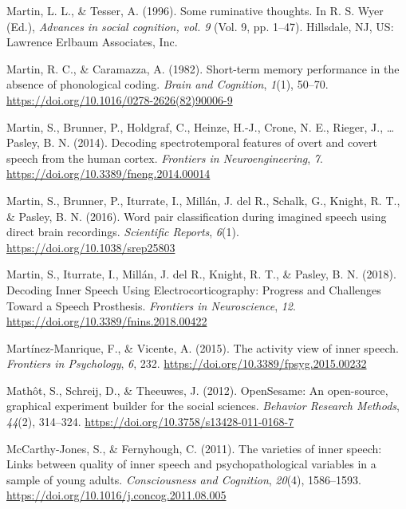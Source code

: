 \documentclass[a4paper,12pt,twoside,openright,oldfontcommands]{memoir}
\begin{document}
\leavevmode\hypertarget{ref-Martin}{}%
Martin, L. L., \& Tesser, A. (1996). Some ruminative thoughts. In R. S. Wyer (Ed.), \emph{Advances in social cognition, vol. 9} (Vol. 9, pp. 1--47). Hillsdale, NJ, US: Lawrence Erlbaum Associates, Inc.

\leavevmode\hypertarget{ref-martin_short-term_1982}{}%
Martin, R. C., \& Caramazza, A. (1982). Short-term memory performance in the absence of phonological coding. \emph{Brain and Cognition}, \emph{1}(1), 50--70. \url{https://doi.org/10.1016/0278-2626(82)90006-9}

\leavevmode\hypertarget{ref-martin_decoding_2014}{}%
Martin, S., Brunner, P., Holdgraf, C., Heinze, H.-J., Crone, N. E., Rieger, J., \ldots{} Pasley, B. N. (2014). Decoding spectrotemporal features of overt and covert speech from the human cortex. \emph{Frontiers in Neuroengineering}, \emph{7}. \url{https://doi.org/10.3389/fneng.2014.00014}

\leavevmode\hypertarget{ref-martin_word_2016}{}%
Martin, S., Brunner, P., Iturrate, I., Millán, J. del R., Schalk, G., Knight, R. T., \& Pasley, B. N. (2016). Word pair classification during imagined speech using direct brain recordings. \emph{Scientific Reports}, \emph{6}(1). \url{https://doi.org/10.1038/srep25803}

\leavevmode\hypertarget{ref-martin_decoding_2018}{}%
Martin, S., Iturrate, I., Millán, J. del R., Knight, R. T., \& Pasley, B. N. (2018). Decoding Inner Speech Using Electrocorticography: Progress and Challenges Toward a Speech Prosthesis. \emph{Frontiers in Neuroscience}, \emph{12}. \url{https://doi.org/10.3389/fnins.2018.00422}

\leavevmode\hypertarget{ref-Martinez-Manrique2015}{}%
Martínez-Manrique, F., \& Vicente, A. (2015). The activity view of inner speech. \emph{Frontiers in Psychology}, \emph{6}, 232. \url{https://doi.org/10.3389/fpsyg.2015.00232}

\leavevmode\hypertarget{ref-mathot_opensesame_2012}{}%
Mathôt, S., Schreij, D., \& Theeuwes, J. (2012). OpenSesame: An open-source, graphical experiment builder for the social sciences. \emph{Behavior Research Methods}, \emph{44}(2), 314--324. \url{https://doi.org/10.3758/s13428-011-0168-7}

\leavevmode\hypertarget{ref-McCarthy-Jones2011}{}%
McCarthy-Jones, S., \& Fernyhough, C. (2011). The varieties of inner speech: Links between quality of inner speech and psychopathological variables in a sample of young adults. \emph{Consciousness and Cognition}, \emph{20}(4), 1586--1593. \url{https://doi.org/10.1016/j.concog.2011.08.005}
\end{document}
